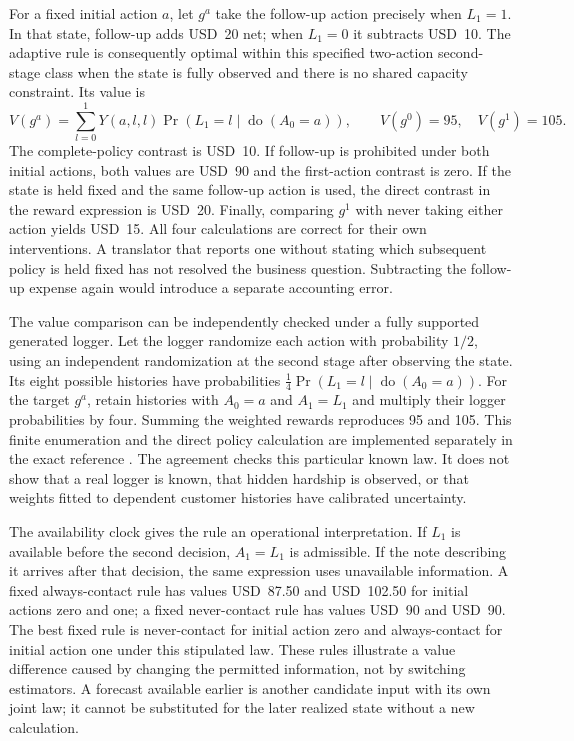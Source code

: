 For a fixed initial action $a$, let $g^a$ take the follow-up action precisely
when $L_1=1$. In that state, follow-up adds USD~20 net; when $L_1=0$ it
subtracts USD~10. The adaptive rule is consequently optimal within this
specified two-action second-stage class when the state is fully observed
and there is no shared capacity constraint. Its value is
\begin{equation}
 V(g^a)=\sum_{l=0}^1Y(a,l,l)\Pr(L_1=l\mid\operatorname{do}(A_0=a)),
 \qquad V(g^0)=95,\quad V(g^1)=105.
 \label{exec17:l2-sequential-value}
\end{equation}
The complete-policy contrast is USD~10. If follow-up is prohibited under
both initial actions, both values are USD~90 and the first-action contrast
is zero. If the state is held fixed and the same follow-up action is used,
the direct contrast in the reward expression is USD~20. Finally, comparing
$g^1$ with never taking either action yields USD~15. All four calculations
are correct for their own interventions. A translator that reports one
without stating which subsequent policy is held fixed has not resolved the
business question. Subtracting the follow-up expense again would introduce
a separate accounting error.

The value comparison can be independently checked under a fully supported
generated logger. Let the logger randomize each action with probability
$1/2$, using an independent randomization at the second stage after observing
the state. Its eight possible histories have probabilities
$\tfrac14\Pr(L_1=l\mid\operatorname{do}(A_0=a))$. For the target $g^a$,
retain histories with $A_0=a$ and $A_1=L_1$ and multiply their logger
probabilities by four. Summing the weighted rewards reproduces 95 and 105.
This finite enumeration and the direct policy calculation are implemented
separately in the exact reference \citep{exec17_l2_policy_exact}. The agreement
checks this particular known law. It does not show that a real logger is
known, that hidden hardship is observed, or that weights fitted to dependent
customer histories have calibrated uncertainty.

The availability clock gives the rule an operational interpretation. If
$L_1$ is available before the second decision, $A_1=L_1$ is admissible.
If the note describing it arrives after that decision, the same expression
uses unavailable information. A fixed always-contact rule has values
USD~87.50 and USD~102.50 for initial actions zero and one; a fixed never-contact
rule has values USD~90 and USD~90. The best fixed rule is never-contact for initial action zero and
always-contact for initial action one under this stipulated law. These rules
illustrate a value difference caused by changing the permitted information,
not by switching estimators. A forecast available earlier is another
candidate input with its own joint law; it cannot be substituted for the
later realized state without a new calculation.

